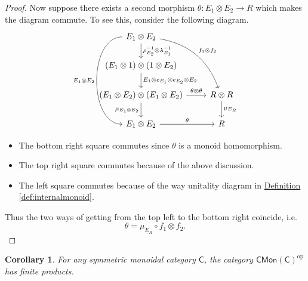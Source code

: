 \documentclass[a4paper,10pt]{scrreprt}
\theoremstyle{definition}
\theoremstyle{plain}
\newtheorem{corollary}{Corollary}[section]
\theoremstyle{remark}
\begin{document}
\begin{proof}
  Now suppose there exists a second morphism $\theta\colon E_{1} \otimes E_{2} \to R$ which makes the diagram commute. To see this, consider the following diagram. 
  \begin{equation*}
    \begin{tikzcd}
      E_{1} \otimes E_{2}
      \arrow[d, "\rho_{E_{2}}^{-1} \otimes \lambda_{E_{1}}^{-1}"]
      \arrow[ddd, bend right=90, swap, "E_{1} \otimes E_{2}"]
      \arrow[rdd, bend left, "f_{1} \otimes f_{2}"]
      \\
      (E_{1} \otimes 1) \otimes (1 \otimes E_{2})
      \arrow[d, "E_{1} \otimes e_{E_{1}} \otimes e_{E_{2}} \otimes E_{2}"]
      \\
      (E_{1} \otimes E_{2}) \otimes (E_{1} \otimes E_{2})
      \arrow[r, "\theta \otimes \theta"]
      \arrow[d, swap, "\mu_{E_{1} \otimes E_{2}}"]
      & R \otimes R
      \arrow[d, "\mu_{E_{R}}"]
      \\
      E_{1} \otimes E_{2}
      \arrow[r, "\theta"]
      & R
    \end{tikzcd}
  \end{equation*}
  \begin{itemize}
    \item The bottom right square commutes since $\theta$ is a monoid homomorphism.

    \item The top right square commutes because of the above discussion.

    \item The left square commutes because of the way unitality diagram in \hyperref[def:internalmonoid]{Definition \ref*{def:internalmonoid}}.
  \end{itemize}

  Thus the two ways of getting from the top left to the bottom right coincide, i.e.
  \begin{equation*}
    \theta = \mu_{E_{R}} \circ f_{1} \otimes f_{2}.
  \end{equation*}
\end{proof}

\begin{corollary}
  \label{cor:cmonophasproducts}
  For any symmetric monoidal category $\mathsf{C}$, the category $\mathsf{CMon}(\mathsf{C})^{\mathrm{op}}$ has finite products.
\end{corollary}
\end{document}
